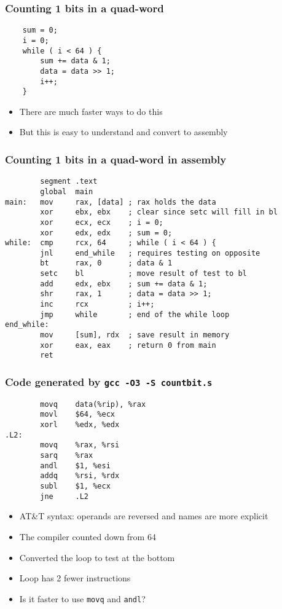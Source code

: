 \documentclass{beamer}
\begin{document}
\begin{frame}[fragile]
    \frametitle{Counting 1 bits in a quad-word}
\begin{verbatim}
    sum = 0;
    i = 0;
    while ( i < 64 ) {
        sum += data & 1;
        data = data >> 1;
        i++;
    }
\end{verbatim}
    \begin{itemize}
        \item There are much faster ways to do this
        \item But this is easy to understand and convert to assembly
    \end{itemize}
\end{frame}

\begin{frame}[fragile]
    \frametitle{Counting 1 bits in a quad-word in assembly}
\small
\begin{verbatim}
        segment .text
        global  main
main:   mov     rax, [data] ; rax holds the data
        xor     ebx, ebx    ; clear since setc will fill in bl
        xor     ecx, ecx    ; i = 0;
        xor     edx, edx    ; sum = 0;
while:  cmp     rcx, 64     ; while ( i < 64 ) {
        jnl     end_while   ; requires testing on opposite
        bt      rax, 0      ; data & 1
        setc    bl          ; move result of test to bl
        add     edx, ebx    ; sum += data & 1;
        shr     rax, 1      ; data = data >> 1;
        inc     rcx         ; i++;
        jmp     while       ; end of the while loop
end_while:
        mov     [sum], rdx  ; save result in memory
        xor     eax, eax    ; return 0 from main
        ret
\end{verbatim}
\end{frame}
\begin{frame}[fragile]
    \frametitle{Code generated by {\tt gcc -O3 -S countbit.s}}
\begin{verbatim}
        movq    data(%rip), %rax
        movl    $64, %ecx
        xorl    %edx, %edx
.L2:
        movq    %rax, %rsi
        sarq    %rax
        andl    $1, %esi
        addq    %rsi, %rdx
        subl    $1, %ecx
        jne     .L2
\end{verbatim}
    \begin{itemize}
        \item AT\&T syntax: operands are reversed and names are more explicit
        \item The compiler counted down from 64
        \item Converted the loop to test at the bottom
        \item Loop has 2 fewer instructions
        \item Is it faster to use {\tt movq} and {\tt andl}?
    \end{itemize}
\end{frame}
\end{document}
